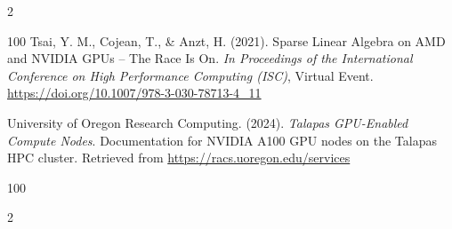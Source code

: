 \documentclass{article}
\begin{document}
\begin{multicols}{2}
\begin{thebibliography}{100}
Tsai, Y. M., Cojean, T., \& Anzt, H. (2021). Sparse Linear Algebra on AMD and NVIDIA GPUs – The Race Is On. 
\emph{In Proceedings of the International Conference on High Performance Computing (ISC)}, Virtual Event.
\url{https://doi.org/10.1007/978-3-030-78713-4_11}


University of Oregon Research Computing. (2024). \emph{Talapas GPU-Enabled Compute Nodes}.
Documentation for NVIDIA A100 GPU nodes on the Talapas HPC cluster. Retrieved from 
\url{https://racs.uoregon.edu/services}

\end{thebibliography}{100}


\end{multicols}{2}
\end{document}
